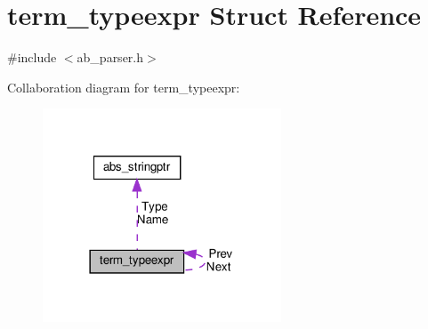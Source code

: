 \hypertarget{structterm__typeexpr}{}\section{term\+\_\+typeexpr Struct Reference}
\label{structterm__typeexpr}


{\ttfamily \#include $<$ab\+\_\+parser.\+h$>$}



Collaboration diagram for term\+\_\+typeexpr\+:\nopagebreak
\begin{figure}[H]
\begin{center}
\leavevmode
\includegraphics[width=201pt]{db/de8/structterm__typeexpr__coll__graph}
\end{center}
\end{figure}

